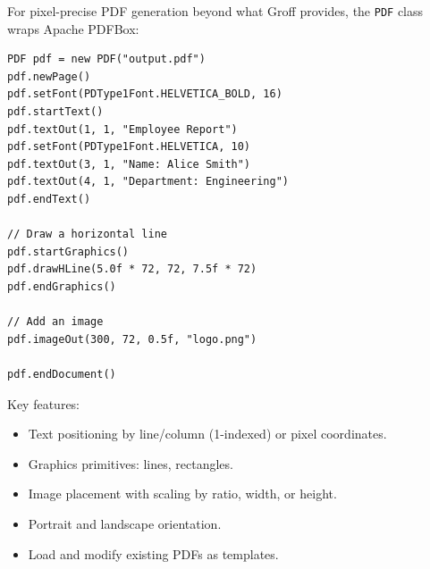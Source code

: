 For pixel-precise PDF generation beyond what Groff provides, the \texttt{PDF} class wraps Apache PDFBox:

\begin{lstlisting}[style=groovy]
PDF pdf = new PDF("output.pdf")
pdf.newPage()
pdf.setFont(PDType1Font.HELVETICA_BOLD, 16)
pdf.startText()
pdf.textOut(1, 1, "Employee Report")
pdf.setFont(PDType1Font.HELVETICA, 10)
pdf.textOut(3, 1, "Name: Alice Smith")
pdf.textOut(4, 1, "Department: Engineering")
pdf.endText()

// Draw a horizontal line
pdf.startGraphics()
pdf.drawHLine(5.0f * 72, 72, 7.5f * 72)
pdf.endGraphics()

// Add an image
pdf.imageOut(300, 72, 0.5f, "logo.png")

pdf.endDocument()
\end{lstlisting}

\noindent
Key features:
\begin{itemize}
  \item Text positioning by line/column (1-indexed) or pixel coordinates.
  \item Graphics primitives: lines, rectangles.
  \item Image placement with scaling by ratio, width, or height.
  \item Portrait and landscape orientation.
  \item Load and modify existing PDFs as templates.
\end{itemize}
